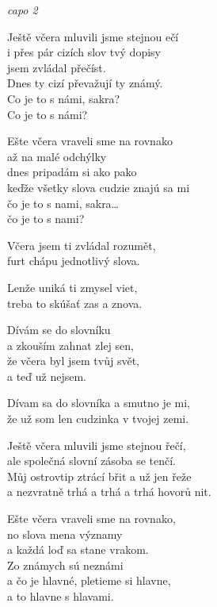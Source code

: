 
\re{}\textit{capo 2}

\ve{}
Ještě včera mluvili jsme stejnou ečí \\
i přes pár cizích slov tvý dopisy \\
jsem zvládal přečíst. \\
Dnes ty cizí převažují ty známý. \\
Co je to s námi, sakra?  \quad {} \\
Co je to s námi?  \quad {} 

\ve{}
Ešte včera vraveli sme na rovnako \\
až na malé odchýlky \\
dnes pripadám si ako pako \\
keďže všetky slova cudzie znajú sa mi \\
čo je to s nami, sakra\ldots \\
čo je to s nami? 

\ve{}
Včera jsem ti zvládal rozumět, \\
furt chápu jednotlivý slova.

Lenže uniká ti zmysel viet, \\
treba to skúšať zas a znova. 

\cho{}
Dívám se do slovníku \\
a zkouším zahnat zlej sen, \\
že včera byl jsem tvůj svět, \\
a teď už nejsem.

Dívam sa do slovníka a smutno je mi, \\
že už som len cudzinka v tvojej zemi. 

\ve{}
Ještě včera mluvili jsme stejnou řečí, \\
ale společná slovní zásoba se tenčí. \\
Můj ostrovtip ztrácí břit a už jen řeže \\
a nezvratně trhá a trhá a trhá hovorů nit. 

\ve{}
Ešte včera vraveli sme na rovnako, \\
no slova mena významy \\
a každá loď sa stane vrakom. \\
Zo známych sú neznámi \\
a čo je hlavné, pletieme si hlavne, \\
a to hlavne s hlavami. 

